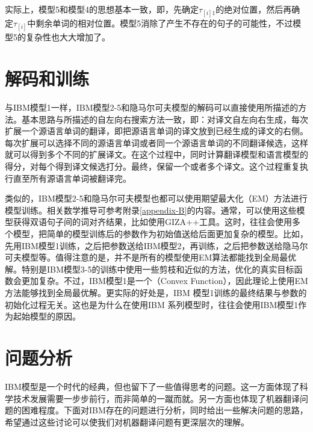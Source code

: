 \parinterval 实际上，模型5和模型4的思想基本一致，即，先确定$\tau_{[i]1}$的绝对位置，然后再确定$\tau_{[i]}$中剩余单词的相对位置。模型5消除了产生不存在的句子的可能性，不过模型5的复杂性也大大增加了。

\sectionnewpage
\section{解码和训练}

\parinterval 与IBM模型1一样，IBM模型2-5和隐马尔可夫模型的解码可以直接使用{\chapterfive}所描述的方法。基本思路与{\chaptertwo}所描述的自左向右搜索方法一致，即：对译文自左向右生成，每次扩展一个源语言单词的翻译，即把源语言单词的译文放到已经生成的译文的右侧。每次扩展可以选择不同的源语言单词或者同一个源语言单词的不同翻译候选，这样就可以得到多个不同的扩展译文。在这个过程中，同时计算翻译模型和语言模型的得分，对每个得到译文候选打分。最终，保留一个或者多个译文。这个过程重复执行直至所有源语言单词被翻译完。

\parinterval 类似的，IBM模型2-5和隐马尔可夫模型也都可以使用期望最大化（EM）方法进行模型训练。相关数学推导可参考附录\ref{appendix-B}的内容。通常，可以使用这些模型获得双语句子间的词对齐结果，比如使用GIZA++工具。这时，往往会使用多个模型，把简单的模型训练后的参数作为初始值送给后面更加复杂的模型。比如，先用IBM模型1训练，之后把参数送给IBM模型2，再训练，之后把参数送给隐马尔可夫模型等。值得注意的是，并不是所有的模型使用EM算法都能找到全局最优解。特别是IBM模型3-5的训练中使用一些剪枝和近似的方法，优化的真实目标函数会更加复杂。不过，IBM模型1是一个{\small{}}（Convex Function），因此理论上使用EM方法能够找到全局最优解。更实际的好处是，IBM 模型1训练的最终结果与参数的初始化过程无关。这也是为什么在使用IBM 系列模型时，往往会使用IBM模型1作为起始模型的原因。


\sectionnewpage
\section{问题分析}

\parinterval IBM模型是一个时代的经典，但也留下了一些值得思考的问题。这一方面体现了科学技术发展需要一步步前行，而非简单的一蹴而就。另一方面也体现了机器翻译问题的困难程度。下面对IBM存在的问题进行分析，同时给出一些解决问题的思路，希望通过这些讨论可以使我们对机器翻译问题有更深层次的理解。

